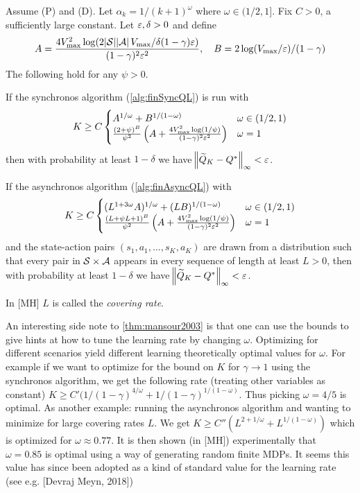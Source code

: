 \begin{thm}[Mansour 2003]
  Assume (P) and (D). Let $\alpha_k = 1/(k+1)^\omega$ where
  $\omega \in (1/2,1]$.
  Fix $C>0$, a sufficiently large constant.
  Let $\varepsilon, \delta >0$ and define
  \[ A = \frac{4V^2_{\max} \log(2\abs{\mathcal{S}}\abs{\mathcal{A}} V_{\max}/\delta
  (1-\gamma)\varepsilon)}{(1-\gamma)^2\varepsilon^2}, \quad B= 2 \log(V_{\max}/\varepsilon)/(1-\gamma) \]
  The following hold for any $\psi > 0$.

  If the synchronos algorithm (\cref{alg:finSyncQL}) is run with
  \[ K \geq C \begin{cases}
      A^{1/\omega} + B^{1/(1-\omega)} & \omega \in (1/2,1)
      \\ \frac{(2 + \psi)^B}{\psi^2} \left(A +
      \frac{4 V^2_{\max} \log(1/\psi)}{(1-\gamma)^2 \varepsilon^2} \right)
      & \omega = 1
    \end{cases}
  \]
  then with probability at least $1-\delta$ we have
  $\norm{\widetilde{Q}_K - Q^*}_\infty < \varepsilon$.

  If the asynchronos algorithm (\cref{alg:finAsyncQL}) with 
  \[ K \geq C \begin{cases}
      (L^{1 + 3 \omega} A)^{1/\omega} + (L B)^{1/(1-\omega)}
      & \omega \in (1/2,1)
      \\ \frac{(L + \psi L + 1)^B}{\psi^2}
      \left(A + \frac{4V^2_{\max} \log(1/\psi)}{(1-\gamma)^2\varepsilon^2} \right)
	& \omega = 1
  \end{cases} \]
  and the state-action pairs $(s_1, a_1, \dots, s_K, a_K)$ are drawn
  from a distribution such that every pair in $\mathcal{S}\times\mathcal{A}$
  appears in every sequence of length at least $L > 0$,
  then with probability at least $1-\delta$ we have
  $\norm{\widetilde{Q}_K - Q^*}_\infty < \varepsilon$.
  \label{thm:mansour2003}
\end{thm}
In [MH] $L$ is called the \emph{covering rate}.

An interesting side note to \cref{thm:mansour2003} is that
one can use the bounds to give hints at how to tune the learning rate
by changing $\omega$. Optimizing for different scenarios yield
different learning theoretically optimal values for $\omega$.
For example if we want to optimize for the bound on $K$ for 
$\gamma \to 1$ using the synchronos algorithm,
we get the following rate (treating other variables as constant)
$K \geq C'(1/(1-\gamma)^{4/\omega} + 1/(1-\gamma)^{1/(1-\omega)}$.
Thus picking $\omega = 4/5$ is optimal.
As another example: running the asynchronos algorithm and wanting to
minimize for large covering rates $L$. We get
$K \geq C''(L^{2+1/\omega} + L^{1/(1-\omega)})$
which is optimized for $\omega \approx 0.77$.
It is then shown (in [MH]) experimentally that $\omega = 0.85$ is 
optimal using a way of generating random finite MDPs.
It seems this value has since been adopted as a kind of standard
value for the learning rate
(see e.g. [Devraj Meyn, 2018]) %

